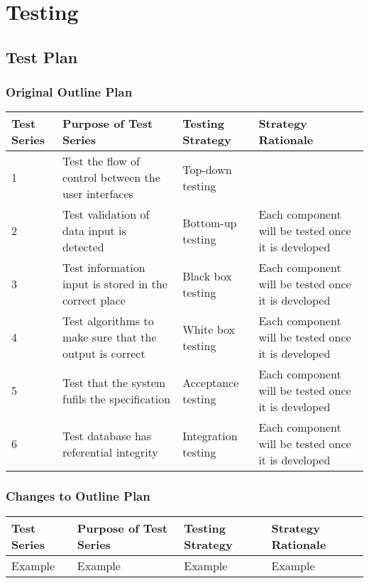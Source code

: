 \chapter{Testing}

\section{Test Plan}

\begin{landscape}
\subsection{Original Outline Plan}

\begin{center}
    \begin{tabular}{|p{2cm}|p{5cm}|p{5cm}|p{4cm}|}
        \hline
        \textbf{Test Series} & \textbf{Purpose of Test Series} & \textbf{Testing Strategy} & \textbf{Strategy Rationale}\\ \hline
         1 & Test the flow of control between the user interfaces & Top-down testing &  \\ \hline
	2 & Test validation of data input is detected & Bottom-up testing & Each component will be tested once it is developed \\ \hline
	3 & Test information input is stored in the correct place & Black box testing & Each component will be tested once it is developed \\ \hline
	4 & Test algorithms to make sure that the output is correct & White box testing & Each component will be tested once it is developed \\ \hline
	5 & Test that the system fufils the specification & Acceptance testing & Each component will be tested once it is developed \\ \hline
	6 & Test database has referential integrity & Integration testing & Each component will be tested once it is developed \\ \hline
    \end{tabular}
\end{center}

\subsection{Changes to Outline Plan}

\begin{center}
    \begin{tabular}{|p{2cm}|p{5cm}|p{5cm}|p{4cm}|}
        \hline
        \textbf{Test Series} & \textbf{Purpose of Test Series} & \textbf{Testing Strategy} & \textbf{Strategy Rationale}\\ \hline
        Example & Example & Example & Example \\ \hline
    \end{tabular}
\end{center}


\end{landscape}
